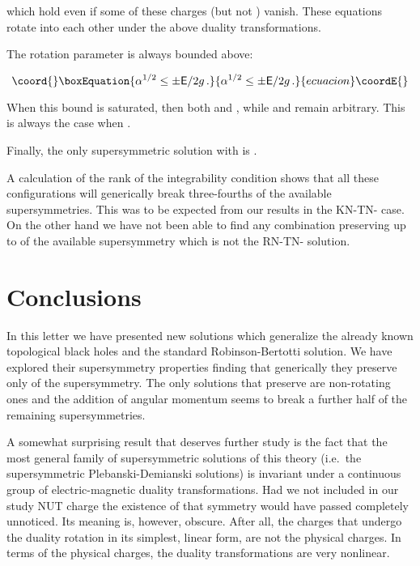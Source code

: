 \documentclass[12pt,a4paper]{article}
\begin{document}
\noindent which hold even if some of these charges (but not \coordHE{}) vanish. 
These equations rotate into each other under the above duality
transformations.

The rotation parameter is always bounded above:

\begin{equation}\coord{}\boxEquation{
\alpha^{1/2}\leq  \pm\mathsf{E}/2g\, .  
}{
\alpha^{1/2}\leq  \pm\mathsf{E}/2g\, .  
}{ecuacion}\coordE{}\end{equation}

When this bound is saturated, then both \coordHE{} and
\coordHE{}, while \coordHE{} and \coordHE{} remain arbitrary.
This is always the case when \coordHE{}.

Finally, the only supersymmetric solution with \coordHE{} is
\coordHE{}.

A calculation of the rank of the integrability condition shows that 
all these configurations will generically break three-fourths of the 
available supersymmetries. This was to be expected from our results
in the KN-TN-\coordHE{} case. On the other hand we have not been able to 
find any combination preserving up to \coordHE{} of the available
supersymmetry which is not the RN-TN-\coordHE{} solution.


\section{Conclusions}
\label{sec-conclusions}


In this letter we have presented new solutions which generalize the
already known topological black holes and the standard
Robinson-Bertotti solution. We have explored their supersymmetry
properties finding that generically they preserve only \coordHE{} of the
supersymmetry. The only solutions that preserve \coordHE{} are non-rotating
ones and the addition of angular momentum seems to break a further half
of the remaining supersymmetries.

A somewhat surprising result that deserves further study is the fact
that the most general family of supersymmetric solutions of this
theory (i.e.~the supersymmetric Plebanski-Demianski solutions) is
invariant under a continuous \coordHE{} group of electric-magnetic
duality transformations. Had we not included in our study NUT charge
the existence of that symmetry would have passed completely unnoticed.
Its meaning is, however, obscure. After all, the charges that undergo
the duality rotation in its simplest, linear form, are not the
physical charges. In terms of the physical charges, the duality
transformations are very nonlinear.
\end{document}
